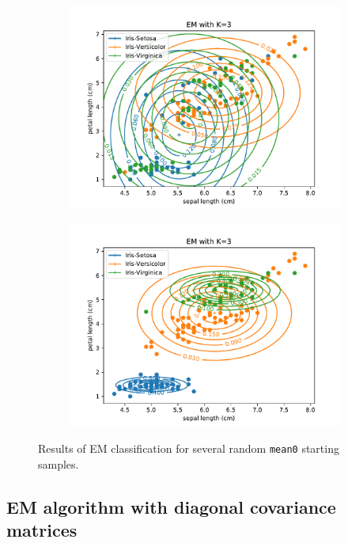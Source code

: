 \documentclass{article}
\begin{document}
\begin{figure}[!ht]
{\begin{subfigure}{0.6\textwidth}
	\includegraphics[width=\textwidth]{./Figures/2_2_EM_randinit2}
	\end{subfigure}
	\begin{subfigure}{0.6\textwidth}
	\includegraphics[width=\textwidth]{./Figures/2_2_EM_randinit3}
	\end{subfigure}
	}	
	\caption{Results of EM classification for several random \texttt{mean0} starting samples.}
	\label{2_2_EM_rand_init}
\end{figure}

\clearpage

\subsection{EM algorithm with diagonal covariance matrices}
\end{document}
